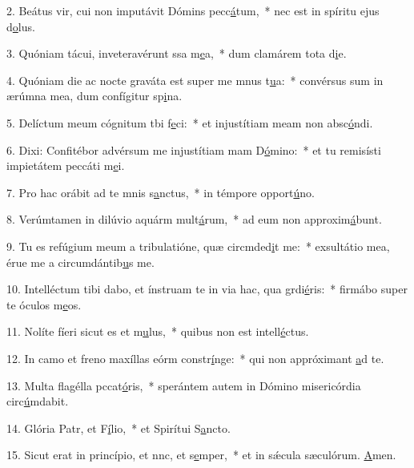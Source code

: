2. Beátus vir, cui non imputávit Dómins pecc\uline{á}tum,~* nec est in spíritu ejus d\uline{o}lus.\par 
3. Quóniam tácui, inveteravérunt ssa m\uline{e}a,~* dum clamárem tota d\uline{i}e.\par 
4. Quóniam die ac nocte graváta est super me mnus t\uline{u}a:~* convérsus sum in ærúmna mea, dum confígitur sp\uline{i}na.\par 
5. Delíctum meum cógnitum tbi f\uline{e}ci:~* et injustítiam meam non absc\uline{ó}ndi.\par 
6. Dixi: Confitébor advérsum me injustítiam mam D\uline{ó}mino:~* et tu remisísti impietátem peccáti m\uline{e}i.\par 
7. Pro hac orábit ad te mnis s\uline{a}nctus,~* in témpore opport\uline{ú}no.\par 
8. Verúmtamen in dilúvio aquárm mult\uline{á}rum,~* ad eum non approxim\uline{á}bunt.\par 
9. Tu es refúgium meum a tribulatióne, quæ circmded\uline{i}t me:~* exsultátio mea, érue me a circumdántib\uline{u}s me.\par 
10. Intelléctum tibi dabo, et ínstruam te in via hac, qua grdi\uline{é}ris:~* firmábo super te óculos m\uline{e}os.\par 
11. Nolíte fíeri sicut es et m\uline{u}lus,~* quibus non est intell\uline{é}ctus.\par 
12. In camo et freno maxíllas eórm constr\uline{í}nge:~* qui non appróximant \uline{a}d te.\par 
13. Multa flagélla pccat\uline{ó}ris,~* sperántem autem in Dómino misericórdia circ\uline{ú}mdabit.\par 
14. Glória Patr, et F\uline{í}lio,~* et Spirítui S\uline{a}ncto.\par 
15. Sicut erat in princípio, et nnc, et s\uline{e}mper,~* et in sǽcula sæculórum. \uline{A}men.\par 
